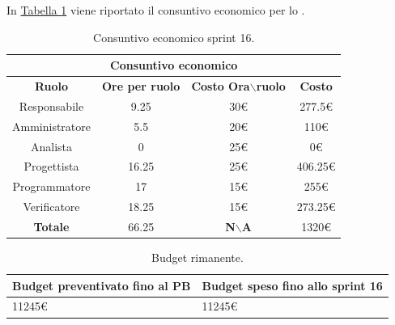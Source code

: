 In \hyperref[tab:sprint16_consuntivo_economico]{Tabella \ref{tab:sprint16_consuntivo_economico}} viene riportato il consuntivo economico per lo .
\begin{table}[H]
    \centering
    \begin{tabular}{|c|c|c|c|}
        \hline
            \multicolumn{4}{|c|}{\textbf{Consuntivo economico}} \\ 
        \hline
            \textbf{Ruolo} & \textbf{Ore per ruolo} & \textbf{Costo Ora$\backslash$ruolo} & \textbf{Costo} \\
        \hline
        Responsabile & 9.25 & 30€ & 277.5€ \\
        \hline
        Amministratore & 5.5 & 20€ & 110€ \\
        \hline
        Analista & 0 & 25€ & 0€ \\
        \hline
        Progettista & 16.25 & 25€ & 406.25€ \\
        \hline
        Programmatore & 17 & 15€ & 255€ \\
        \hline
        Verificatore & 18.25 & 15€ & 273.25€ \\
        \hline 
        \textbf{Totale} & 66.25 & \textbf{N$\backslash$A} & 1320€  \\
        \hline
    \end{tabular}
    \caption{Consuntivo economico sprint 16.}
    \label{tab:sprint16_consuntivo_economico}
\end{table}

\begin{table}[H]
    \centering
    \begin{tabular}{| l | l |}
    \hline
    \textbf{Budget preventivato fino al PB} & \textbf{Budget speso fino allo sprint 16}\\
    \hline
        11245€ & 11245€ \\
    \hline
    \end{tabular}
    \caption{Budget rimanente.}
    \label{tab:budget_rimanente_sprint16}
\end{table}